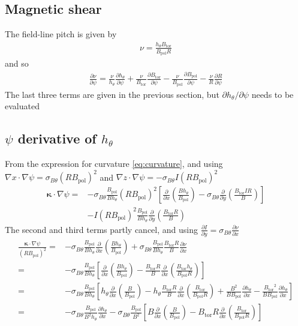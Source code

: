 \documentclass[12pt]{article}
\def\L{\left}
\def\R{\right}
\newcommand{\sbt}{\ensuremath{\sigma_{B\theta}}}
\newcommand{\deriv}[2]{\ensuremath{\frac{\partial #1}{\partial #2}}}
\newcommand{\hthe}{\ensuremath{h_\theta}}
\newcommand{\Bp}{\ensuremath{B_{\text{pol}}}}
\newcommand{\Bt}{\ensuremath{B_{\text{tor}}}}
\newcommand{\ve}[1]{\ensuremath{\boldsymbol{#1}}}
\newcommand{\kvec}{\ve{\kappa}}
\newcommand{\rbp}{\ensuremath{R\Bp}}
\newcommand{\rbpsq}{\ensuremath{\L(\rbp\R)^2}}
\begin{document}
\subsection{Magnetic shear}
%
The field-line pitch is given by
%
\begin{align*}
\nu = \frac{\hthe\Bt}{\Bp R}
\end{align*}
%
and so
%
\begin{align*}
\deriv{\nu}{\psi} = \frac{\nu}{\hthe}\deriv{\hthe}{\psi} +
\frac{\nu}{\Bt}\deriv{\Bt}{\psi} - \frac{\nu}{\Bp}\deriv{\Bp}{\psi} -
\frac{\nu}{R}\deriv{R}{\psi}
\end{align*}
%
The last three terms are given in the previous section, but
$\partial\hthe/\partial\psi$ needs to be evaluated



\subsection{\texorpdfstring{$\psi$}{psi}
%
 derivative of \texorpdfstring{$\hthe$}{h}} From the expression for curvature
 \ref{eq:curvature}, and using $\nabla x \cdot \nabla \psi = \sbt \L(R\Bp\R)^2$
 and $\nabla z\cdot\nabla \psi = -\sbt I \L(R\Bp\R)^2$
%
\begin{align*}
\kvec\cdot\nabla\psi =& -\sbt
    \frac{\Bp}{B\hthe}\rbpsq\L[\deriv{}{x}\L(\frac{B\hthe}{\Bp}\R) -
    \sbt\deriv{}{y}\L(\frac{\Bt IR}{B}\R)\R] \\ &- I\rbpsq
        \frac{\Bp}{B\hthe}\deriv{}{y}\L(\frac{\Bt R}{B}\R)
\end{align*}
%
The second and third terms partly cancel, and using $\deriv{I}{y} = \sbt
\deriv{\nu}{x}$
%
\begin{align*}
  \frac{\kvec\cdot\nabla\psi}{\rbpsq} =&
    -\sbt\frac{\Bp}{B\hthe}\deriv{}{x}\L(\frac{B\hthe}{\Bp}\R) +
    \sbt\frac{\Bp}{B\hthe}\frac{\Bt R}{B}\deriv{\nu}{x} \\ =&
    -\sbt\frac{\Bp}{B\hthe}\L[\deriv{}{x}\L(\frac{B\hthe}{\Bp}\R) - \frac{\Bt
    R}{B}\deriv{}{x}\L(\frac{\Bt\hthe}{\Bp R}\R)\R] \\ =&
            -\sbt\frac{\Bp}{B\hthe}\L[\hthe\deriv{}{x}\L(\frac{B}{\Bp}\R) -
            \hthe\frac{\Bt R}{B}\deriv{}{x}\L(\frac{\Bt}{\Bp R}\R) +
        \frac{B^2}{B\Bp}\deriv{\hthe}{x} -
    \frac{\Bt^2}{B\Bp}\deriv{\hthe}{x}\R] \\ =& -\sbt
        \frac{\Bp}{B^2\hthe}\deriv{\hthe}{x} -
        \sbt\frac{\Bp}{B^2}\L[B\deriv{}{x}\L(\frac{B}{\Bp}\R) - \Bt
        R\deriv{}{x}\L(\frac{\Bt}{\Bp R}\R)\R]
\end{align*}
\end{document}
